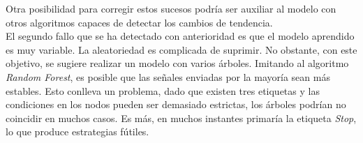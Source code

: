 Otra posibilidad para corregir estos sucesos podr\'ia ser auxiliar al modelo con otros algoritmos capaces de detectar los cambios de tendencia.\\

El segundo fallo que se ha detectado con anterioridad es que el modelo aprendido es muy variable. La aleatoriedad es complicada de suprimir. No obstante, con este objetivo, se sugiere realizar un modelo con varios \'arboles. Imitando al algoritmo \textit{Random Forest}, es posible que las se\~nales enviadas por la mayor\'ia sean m\'as estables. Esto conlleva un problema, dado que existen tres etiquetas y las condiciones en los nodos pueden ser demasiado estrictas, los \'arboles podr\'ian no coincidir en muchos casos. Es m\'as, en muchos instantes primar\'ia la etiqueta \textit{Stop}, lo que produce estrategias f\'utiles.\\


